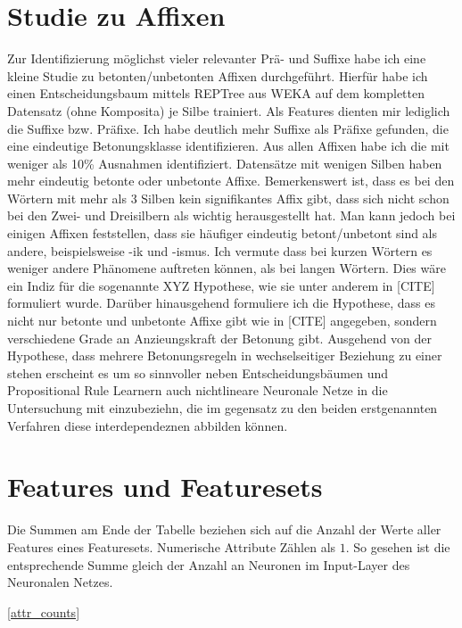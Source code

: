 \renewcommand{\thesection}{\Alph{section}}%
\appendix 
{} 


\section{Studie zu Affixen}
\label{affix_studie}
Zur Identifizierung möglichst vieler relevanter Prä- und Suffixe habe ich eine kleine Studie zu betonten/unbetonten Affixen durchgeführt. Hierfür habe ich einen Entscheidungsbaum mittels REPTree aus WEKA auf dem kompletten Datensatz (ohne Komposita) je Silbe trainiert. Als Features dienten mir lediglich die Suffixe bzw. Präfixe.  
Ich habe deutlich mehr Suffixe als Präfixe gefunden, die eine eindeutige Betonungsklasse identifizieren. Aus allen Affixen habe ich die mit weniger als 10\% Ausnahmen identifiziert.
Datensätze mit wenigen Silben haben mehr eindeutig betonte oder unbetonte Affixe. Bemerkenswert ist, dass es bei den Wörtern mit mehr als 3 Silben kein signifikantes Affix gibt, dass sich nicht schon bei den Zwei- und Dreisilbern als wichtig herausgestellt hat. Man kann jedoch bei einigen Affixen feststellen, dass sie häufiger eindeutig betont/unbetont sind als andere, beispielsweise -ik und -ismus. Ich vermute dass bei kurzen Wörtern es weniger andere Phänomene auftreten können, als bei langen Wörtern. Dies wäre ein Indiz für die sogenannte XYZ Hypothese, wie sie unter anderem in [CITE] formuliert wurde. Darüber hinausgehend formuliere ich die Hypothese, dass es nicht nur betonte und unbetonte Affixe gibt wie in [CITE] angegeben, sondern verschiedene Grade an Anzieungskraft der Betonung gibt. Ausgehend von der Hypothese, dass mehrere Betonungsregeln in wechselseitiger Beziehung zu einer stehen erscheint es um so sinnvoller neben Entscheidungsbäumen und Propositional Rule Learnern auch nichtlineare Neuronale Netze in die Untersuchung mit einzubeziehn, die im gegensatz zu den beiden erstgenannten Verfahren diese interdependeznen abbilden können.







\section{Features und Featuresets}
\label{detail_performance}
Die Summen am Ende der Tabelle beziehen sich auf die Anzahl der Werte aller Features eines Featuresets. Numerische Attribute Zählen als $1$. So gesehen ist die entsprechende Summe gleich der Anzahl an Neuronen im Input-Layer des Neuronalen Netzes.

\ref{attr_counts}
\newpage

